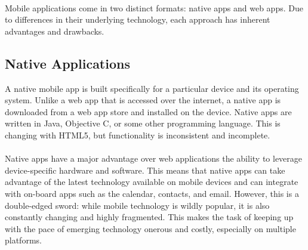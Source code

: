 \paragraph{}
Mobile applications come in two distinct formats: native apps and web apps. Due to differences in their underlying technology, each approach has inherent advantages and drawbacks.


\subsection{Native Applications}

A native mobile app is built specifically for a particular device and its operating system. Unlike a web app that is accessed over the internet, a native app is downloaded from a web app store and installed on the device. Native apps are written in Java, Objective C, or some other programming language. This is changing with HTML5, but functionality is inconsistent and incomplete.



\paragraph{}

Native apps have a major advantage over web applications the ability to leverage device-specific hardware and software. This means that native apps can take advantage of the latest technology available on mobile devices and can integrate with on-board apps such as the calendar, contacts, and email. However, this is a double-edged sword: while mobile technology is wildly popular, it is also constantly changing and highly fragmented. This makes the task of keeping up with the pace of emerging technology onerous and costly, especially on multiple platforms.



